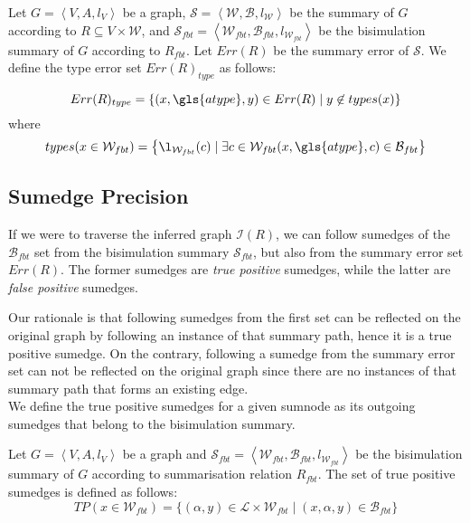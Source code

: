 \begin{definition}
	Let $G=\left\langle V, A, l_V \right\rangle$ be a graph, $\mathcal{S} = \left\langle \mathcal{W}, \mathcal{B}, l_{\mathcal{W}} \right\rangle$ be the summary of $G$ according to $R \subseteq V \times \mathcal{W}$, and $\mathcal{S}_{fbt} = \left\langle \mathcal{W}_{fbt}, \mathcal{B}_{fbt}, l_{\mathcal{W}_{fbt}} \right\rangle$ be the bisimulation summary of $G$ according to $R_{fbt}$. Let $Err(R)$ be the summary error of $\mathcal{S}$. We define the type error set $Err(R)_{type}$ as follows:
	
	$$
	Err(R)_{type} = \left\lbrace (x, \gls{atype}, y) \in Err(R) \mid y \not \in types(x) \right\rbrace
	$$
	where
	$$
	types(x \in \mathcal{W}_{fbt}) = \left\lbrace \l_{\mathcal{W}_{fbt}}(c) \mid \exists c \in \mathcal{W}_{fbt} (x, \gls{atype}, c) \in \mathcal{B}_{fbt} \right\rbrace
	$$
\end{definition}

\subsection{Sumedge Precision}
\label{sec:edge-precision}

If we were to traverse the inferred graph $\mathcal{I}(R)$, we can follow sumedges of the $\mathcal{B}_{fbt}$ set from the bisimulation summary $\mathcal{S}_{fbt}$, but also from the summary error set $Err(R)$. The former sumedges are \emph{true positive} sumedges, while the latter are \emph{false positive} sumedges.

Our rationale is that following sumedges from the first set can be reflected on the original graph by following an instance of that summary path, hence it is a true positive sumedge. On the contrary, following a sumedge from the summary error set can not be reflected on the original graph since there are no instances of that summary path that forms an existing edge.\\

We define the true positive sumedges for a given sumnode as its outgoing sumedges that belong to the bisimulation summary.

\begin{definition}
Let $G=\left\langle V, A, l_V \right\rangle$ be a graph and $\mathcal{S}_{fbt} = \left\langle \mathcal{W}_{fbt}, \mathcal{B}_{fbt}, l_{\mathcal{W}_{fbt}} \right\rangle$ be the bisimulation summary of $G$ according to summarisation relation $R_{fbt}$.
The set of true positive sumedges is defined as follows:
$$
TP(x \in \mathcal{W}_{fbt}) = \{ (\alpha, y) \in \mathcal{L} \times \mathcal{W}_{fbt} \mid (x, \alpha, y) \in \mathcal{B}_{fbt} \}
$$
\end{definition}

